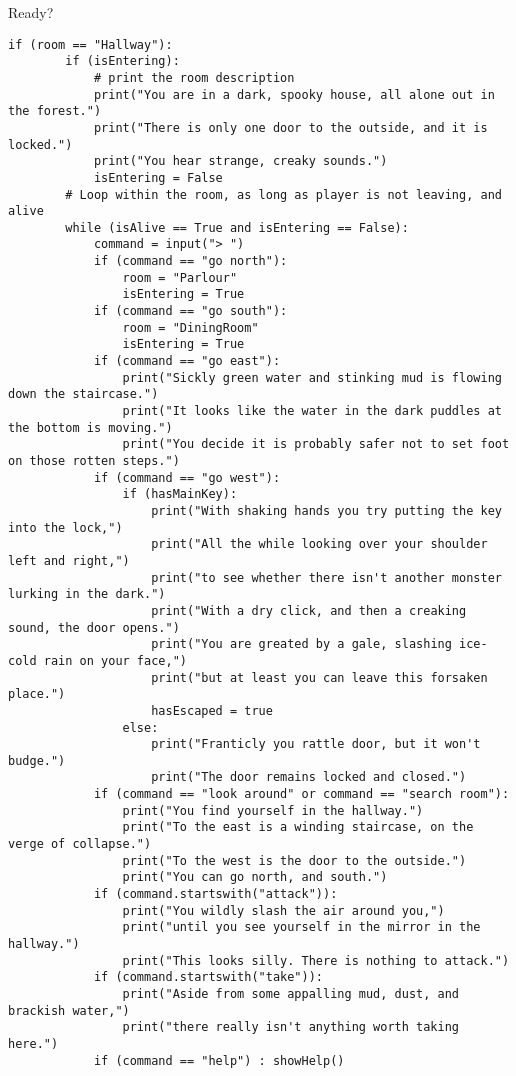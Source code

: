 Ready? 

\begin{lstlisting}[firstnumber=24]
if (room == "Hallway"):
        if (isEntering):
            # print the room description
            print("You are in a dark, spooky house, all alone out in the forest.")
            print("There is only one door to the outside, and it is locked.")
            print("You hear strange, creaky sounds.")
            isEntering = False
        # Loop within the room, as long as player is not leaving, and alive
        while (isAlive == True and isEntering == False):
            command = input("> ")
            if (command == "go north"):
                room = "Parlour"
                isEntering = True
            if (command == "go south"):
                room = "DiningRoom"
                isEntering = True
            if (command == "go east"):
                print("Sickly green water and stinking mud is flowing down the staircase.")
                print("It looks like the water in the dark puddles at the bottom is moving.")
                print("You decide it is probably safer not to set foot on those rotten steps.")
            if (command == "go west"):
                if (hasMainKey):
                    print("With shaking hands you try putting the key into the lock,")
                    print("All the while looking over your shoulder left and right,")
                    print("to see whether there isn't another monster lurking in the dark.")
                    print("With a dry click, and then a creaking sound, the door opens.")
                    print("You are greated by a gale, slashing ice-cold rain on your face,")
                    print("but at least you can leave this forsaken place.")
                    hasEscaped = true
                else:
                    print("Franticly you rattle door, but it won't budge.")
                    print("The door remains locked and closed.")
            if (command == "look around" or command == "search room"):
                print("You find yourself in the hallway.")
                print("To the east is a winding staircase, on the verge of collapse.")
                print("To the west is the door to the outside.")
                print("You can go north, and south.")
            if (command.startswith("attack")):
                print("You wildly slash the air around you,")
                print("until you see yourself in the mirror in the hallway.")
                print("This looks silly. There is nothing to attack.")
            if (command.startswith("take")):
                print("Aside from some appalling mud, dust, and brackish water,")
                print("there really isn't anything worth taking here.")
            if (command == "help") : showHelp()
\end{lstlisting} 



 
 













   